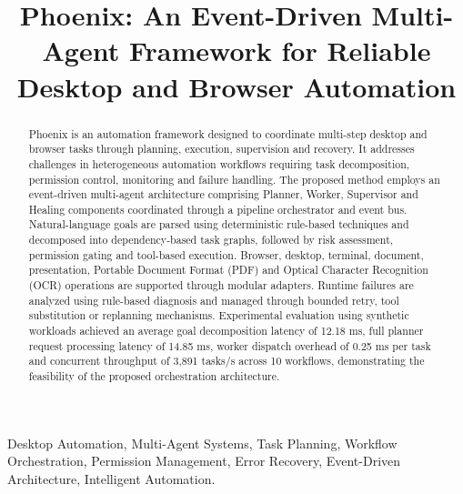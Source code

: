 \documentclass[conference]{IEEEtran}
\begin{document}
\title{Phoenix: An Event-Driven Multi-Agent Framework for Reliable Desktop and Browser Automation}

\author{
}

\maketitle

\begin{abstract}
Phoenix is an automation framework designed to coordinate multi-step desktop and browser tasks through planning, execution, supervision and recovery. It addresses challenges in heterogeneous automation workflows requiring task decomposition, permission control, monitoring and failure handling. The proposed method employs an event-driven multi-agent architecture comprising Planner, Worker, Supervisor and Healing components coordinated through a pipeline orchestrator and event bus. Natural-language goals are parsed using deterministic rule-based techniques and decomposed into dependency-based task graphs, followed by risk assessment, permission gating and tool-based execution. Browser, desktop, terminal, document, presentation, Portable Document Format (PDF) and Optical Character Recognition (OCR) operations are supported through modular adapters. Runtime failures are analyzed using rule-based diagnosis and managed through bounded retry, tool substitution or replanning mechanisms. Experimental evaluation using synthetic workloads achieved an average goal decomposition latency of 12.18 ms, full planner request processing latency of 14.85 ms, worker dispatch overhead of 0.25 ms per task and concurrent throughput of 3,891 tasks/s across 10 workflows, demonstrating the feasibility of the proposed orchestration architecture.
\end{abstract}

\begin{IEEEkeywords}
Desktop Automation, Multi-Agent Systems, Task Planning, Workflow Orchestration, Permission Management, Error Recovery, Event-Driven Architecture, Intelligent Automation.
\end{IEEEkeywords}
\end{document}
